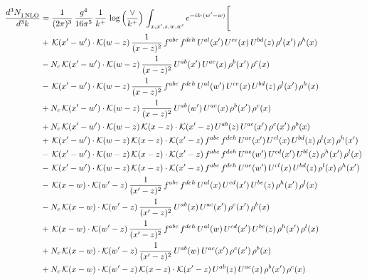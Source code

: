 \documentclass[9pt]{article}
\numberwithin{equation}{section}
\begin{document}
\begin{align}
    \frac{d^{3}N_{1\,\rm NLO}^{\rm}}{d^{3}k}  & = \frac{1}{(2\pi)^{3}}\,\frac{g^{4}}{16\pi^{5}}\,\frac{1}{k^{+}}\,\log{\left(\frac{\vee}{k^{+}}\right)}\, \int_{x,x',z,w,w'}e^{-ik\cdot(w'-w)}\Bigg[\notag\\ & +\,\mathcal{K}(x'-w')\cdot\mathcal{K}(w-z)\,\frac{1}{(x-z)^{2}}\,f^{abc}\,f^{deh}\,U^{al}(x')\,U^{ce}(x)\,U^{bd}(z)\,\rho^{l}(x')\,\rho^{h}(x)\notag \\ 
&-N_{c}\,\mathcal{K}(x'-w')\cdot\mathcal{K}(w-z)\,\frac{1}{(x-z)^{2}}\,U^{ab}(x')\,U^{ac}(x)\,\rho^{b}(x')\,\rho^{c}(x)\notag \\ 
&-\,\mathcal{K}(x'-w')\cdot\mathcal{K}(w-z)\,\frac{1}{(x-z)^{2}}\,f^{abc}\,f^{deh}\,U^{al}(w')\,U^{ce}(x)\,U^{bd}(z)\,\rho^{l}(x')\,\rho^{h}(x)\notag \\ 
&+N_{c}\,\mathcal{K}(x'-w')\cdot\mathcal{K}(w-z)\,\frac{1}{(x-z)^{2}}\,U^{ab}(w')\,U^{ac}(x)\,\rho^{b}(x')\,\rho^{c}(x)\notag \\ 
&+N_{c}\,\mathcal{K}(x'-w')\cdot\mathcal{K}(w-z)\,\mathcal{K}(x-z)\cdot\mathcal{K}(x'-z)\,U^{ab}(z)\,U^{ac}(x')\,\rho^{c}(x')\,\rho^{b}(x)\notag \\ 
&+\,\mathcal{K}(x'-w')\cdot\mathcal{K}(w-z)\,\mathcal{K}(x-z)\cdot\mathcal{K}(x'-z)\,f^{abc}\,f^{deh}\,U^{ae}(x')\,U^{cl}(x)\,U^{bd}(z)\,\rho^{l}(x)\,\rho^{h}(x')\notag \\ 
&-\,\mathcal{K}(x'-w')\cdot\mathcal{K}(w-z)\,\mathcal{K}(x-z)\cdot\mathcal{K}(x'-z)\,f^{abc}\,f^{deh}\,U^{ae}(w')\,U^{cd}(x')\,U^{bl}(z)\,\rho^{h}(x')\,\rho^{l}(x)\notag \\ 
&-\,\mathcal{K}(x'-w')\cdot\mathcal{K}(w-z)\,\mathcal{K}(x-z)\cdot\mathcal{K}(x'-z)\,f^{abc}\,f^{deh}\,U^{ae}(w')\,U^{cl}(x)\,U^{bd}(z)\,\rho^{l}(x)\,\rho^{h}(x')\notag \\ 
&-\,\mathcal{K}(x-w)\cdot\mathcal{K}(w'-z)\,\frac{1}{(x'-z)^{2}}\,f^{abc}\,f^{deh}\,U^{al}(x)\,U^{cd}(x')\,U^{be}(z)\,\rho^{h}(x')\,\rho^{l}(x)\notag \\ 
&-N_{c}\,\mathcal{K}(x-w)\cdot\mathcal{K}(w'-z)\,\frac{1}{(x'-z)^{2}}\,U^{ab}(x)\,U^{ac}(x')\,\rho^{c}(x')\,\rho^{b}(x)\notag \\ 
&+\,\mathcal{K}(x-w)\cdot\mathcal{K}(w'-z)\,\frac{1}{(x'-z)^{2}}\,f^{abc}\,f^{deh}\,U^{al}(w)\,U^{cd}(x')\,U^{be}(z)\,\rho^{h}(x')\,\rho^{l}(x)\notag \\ 
&+N_{c}\,\mathcal{K}(x-w)\cdot\mathcal{K}(w'-z)\,\frac{1}{(x'-z)^{2}}\,U^{ab}(w)\,U^{ac}(x')\,\rho^{c}(x')\,\rho^{b}(x)\notag \\ 
&+N_{c}\,\mathcal{K}(x-w)\cdot\mathcal{K}(w'-z)\,\mathcal{K}(x-z)\cdot\mathcal{K}(x'-z)\,U^{ab}(z)\,U^{ac}(x)\,\rho^{b}(x')\,\rho^{c}(x)\notag \\ 

\end{align}
\end{document}
